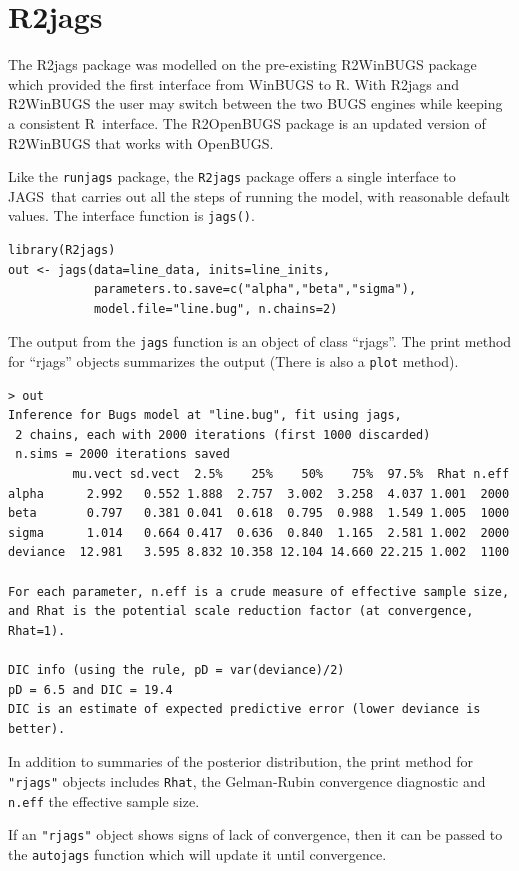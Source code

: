 \documentclass[11pt, a4paper, titlepage]{report}
\newcommand{\JAGS}{\textsf{JAGS}}
\newcommand{\R}{\textsf{R}}
\begin{document}
\section{R2jags}

The R2jags package \citep{SuYajima2015} was modelled on the
pre-existing R2WinBUGS package \citep{SturtzEtal2005} which provided
the first interface from WinBUGS to \R. With R2jags and R2WinBUGS the
user may switch between the two BUGS engines while keeping a
consistent \R\ interface. The R2OpenBUGS package is an updated version
of R2WinBUGS that works with OpenBUGS.

Like the \texttt{runjags} package, the \texttt{R2jags} package offers
a single interface to \JAGS\ that carries out all the steps of running
the model, with reasonable default values. The interface function is
\texttt{jags()}.
\begin{verbatim}
library(R2jags)
out <- jags(data=line_data, inits=line_inits,
            parameters.to.save=c("alpha","beta","sigma"),
            model.file="line.bug", n.chains=2)
\end{verbatim}
The output from the \texttt{jags} function is an object of class ``rjags''.
The print method for ``rjags'' objects summarizes the output (There is
also a \texttt{plot} method).
\begin{verbatim}
> out
Inference for Bugs model at "line.bug", fit using jags,
 2 chains, each with 2000 iterations (first 1000 discarded)
 n.sims = 2000 iterations saved
         mu.vect sd.vect  2.5%    25%    50%    75%  97.5%  Rhat n.eff
alpha      2.992   0.552 1.888  2.757  3.002  3.258  4.037 1.001  2000
beta       0.797   0.381 0.041  0.618  0.795  0.988  1.549 1.005  1000
sigma      1.014   0.664 0.417  0.636  0.840  1.165  2.581 1.002  2000
deviance  12.981   3.595 8.832 10.358 12.104 14.660 22.215 1.002  1100

For each parameter, n.eff is a crude measure of effective sample size,
and Rhat is the potential scale reduction factor (at convergence, Rhat=1).

DIC info (using the rule, pD = var(deviance)/2)
pD = 6.5 and DIC = 19.4
DIC is an estimate of expected predictive error (lower deviance is better).
\end{verbatim}
In addition to summaries of the posterior distribution, the print
method for \texttt{"rjags"} objects includes \texttt{Rhat}, the
Gelman-Rubin convergence diagnostic \citep{GelmanRubin1992} and
\texttt{n.eff} the effective sample size.

If an \texttt{"rjags"} object shows signs of lack of convergence,
then it can be passed to the \texttt{autojags} function which will
update it until convergence.
\end{document}
